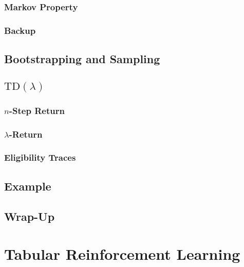 		\subsection{Markov Property} %

		\subsection{Backup} %

	\section{Bootstrapping and Sampling} %

	\section{\( \text{TD}(\lambda) \)} %

		\subsection{\(n\)-Step Return} %

		\subsection{\(\lambda\)-Return} %

		\subsection{Eligibility Traces} %

	\section{Example} %

	\section{Wrap-Up} %

\chapter{Tabular Reinforcement Learning} %

